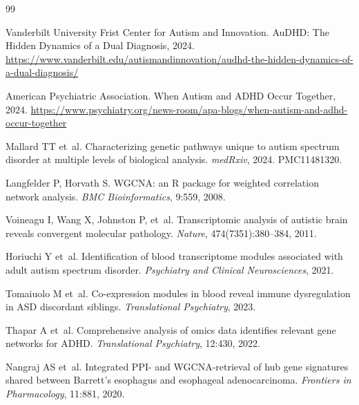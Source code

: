 \documentclass[10pt,twocolumn]{article}
\begin{document}
\begin{thebibliography}{99}

Vanderbilt University Frist Center for Autism and Innovation.
\newblock AuDHD: The Hidden Dynamics of a Dual Diagnosis, 2024.
\newblock \url{https://www.vanderbilt.edu/autismandinnovation/audhd-the-hidden-dynamics-of-a-dual-diagnosis/}

American Psychiatric Association.
\newblock When Autism and ADHD Occur Together, 2024.
\newblock \url{https://www.psychiatry.org/news-room/apa-blogs/when-autism-and-adhd-occur-together}

Mallard TT et~al.
\newblock Characterizing genetic pathways unique to autism spectrum disorder at multiple levels
  of biological analysis.
\newblock \textit{medRxiv}, 2024. PMC11481320.

Langfelder P, Horvath S.
\newblock WGCNA: an R package for weighted correlation network analysis.
\newblock \textit{BMC Bioinformatics}, 9:559, 2008.
\newblock {}

Voineagu I, Wang X, Johnston P, et~al.
\newblock Transcriptomic analysis of autistic brain reveals convergent molecular pathology.
\newblock \textit{Nature}, 474(7351):380--384, 2011.
\newblock {}

Horiuchi Y et~al.
\newblock Identification of blood transcriptome modules associated with adult autism spectrum disorder.
\newblock \textit{Psychiatry and Clinical Neurosciences}, 2021.

Tomaiuolo M et~al.
\newblock Co-expression modules in blood reveal immune dysregulation in ASD discordant siblings.
\newblock \textit{Translational Psychiatry}, 2023.

Thapar A et~al.
\newblock Comprehensive analysis of omics data identifies relevant gene networks for ADHD.
\newblock \textit{Translational Psychiatry}, 12:430, 2022.
\newblock {}

Nangraj AS et~al.
\newblock Integrated PPI- and WGCNA-retrieval of hub gene signatures shared between Barrett's
  esophagus and esophageal adenocarcinoma.
\newblock \textit{Frontiers in Pharmacology}, 11:881, 2020.


\end{thebibliography}
\end{document}
